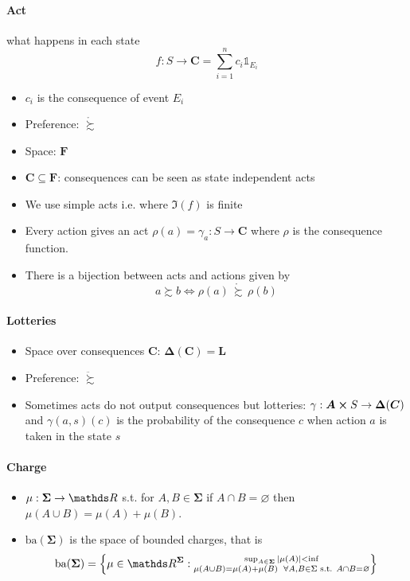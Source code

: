 \documentclass[14pt]{extarticle}
\begin{document}
\paragraph{Act} what happens in each state
\[
	f: S \to \bm C = \sum^n_{i = 1} c_i \mathds 1_{E_i}
\]
\begin{itemize}
	\item $c_i$ is the consequence of event $E_i$
	\item Preference: $\mathring \succsim$
	\item Space: $\bm F$
	\item $\bm C \subseteq \bm F$: consequences can be seen as state independent acts
	\item We use simple acts i.e. where $\Im(f)$ is finite
	\item Every action gives an act $\rho(a) = \gamma_a: S \to \bm C$
	      where $\rho$ is the consequence function.
	\item There is a bijection between acts and actions given by
	      \[
		      a \succsim b \iff \rho(a) \, \mathring \succsim \, \rho(b)
	      \]
\end{itemize}

\paragraph{Lotteries}
\begin{itemize}
	\item Space over consequences $\bm C$: $\bm \Delta(\bm C) = \bm L$
	\item Preference: $\ddot \succsim$
	\item Sometimes acts do not output consequences but lotteries:
	      $\gamma: \bm A \cross S \to \bm \Delta(\bm C)$ and $\gamma(a, s)(c)$ is the probability
	      of the consequence $c$ when action $a$ is taken in the state $s$
\end{itemize}

\paragraph{Charge}
\begin{itemize}
	\item $\mu : \bm \Sigma \to \R$ s.t. for $A, B \in \bm \Sigma$ if $A \cap B = \varnothing$
	      then $\mu(A \cup B) = \mu(A) + \mu(B)$.
	\item $\mathrm{ba}(\bm \Sigma)$ is the space of bounded charges, that is
	      \[
		      \mathrm{ba}(\bm \Sigma) = \left\{
		      \mu \in \R^{\bm \Sigma}:
		      \substack{
			      \sup_{A \in \bm \Sigma} \abs{\mu(A)} < \inf \\
			      \mu(A \cup B) = \mu(A) + \mu(B) \enspace \forall A, B \in \Sigma \text{ s.t. } A \cap B = \varnothing
		      }
		      \right\}
	      \]
\end{itemize}
\end{document}
